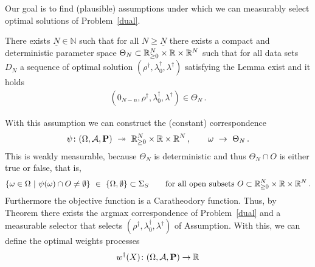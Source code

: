 Our goal is to find (plausible) assumptions under which we can measurably select optimal solutions of Problem~\ref{dual}.

\begin{assumption}
  There exists $\underline{N}\in\mathbb{N}$ such that 
  for all $N\ge \underline{N}$ 
  there exists a compact and deterministic parameter space
  $
  \Theta_N
  \subset
  \mathbb{R}^N_{\ge 0}
  \times
  \mathbb{R}
  \times
  \mathbb{R}^{N}
  $
  such that for all data sets $D_N$
  a sequence of optimal solution
  $(\rho^\dagger,\lambda_0^\dagger,\lambda^\dagger)$
  satisfying the Lemma
exist and it holds
\begin{gather*}
  (0_{N-n},
  \rho^\dagger,\lambda_0^\dagger,\lambda^\dagger)
  \in
  \Theta_N
  \,.
\end{gather*}
\end{assumption}

With this assumption we can construct the (constant) correspondence
\begin{align*}
  \psi
  \colon
  (\Omega,\mathcal{A},\P)
  \ 
  \twoheadrightarrow
  \ 
  \R^N_{\ge 0}
  \times
  \R
  \times
  \R^{N}
  \,,
  \qquad
  \omega
  \ 
  \to
  \ 
  \Theta_N
  \,.
\end{align*}
This is weakly measurable, because $\Theta_N$ is deterministic and thus
$\Theta_N\cap O$ is either true or false, that is,
  \begin{gather*}
    \left\{ 
      \omega\in \Omega
      \ 
      |
      \ 
      \psi(\omega)
      \cap
      O
      \neq
      \emptyset
    \right\}
    \ 
    \in
    \ 
    \left\{ \Omega,\emptyset \right\}
    \subset
    \Sigma_S
    \qquad
    \text{for all open subsets}
    \ 
    O
    \subset
  \R^N_{\ge 0}
  \times
  \R
  \times
  \R^{N}
    \,.
  \end{gather*}
  Furthermore the objective function is a Caratheodory function.
  Thus, by Theorem there exists the argmax correspondence  of Problem~\ref{dual} and a measurable selector that selects
  $(\rho^\dagger,\lambda_0^\dagger,\lambda^\dagger)$ of Assumption.
  With this, we can define the optimal weights processes
  \begin{gather*}
    w^\dagger(X)
    \colon
    (\Omega,\mathcal{A},\mathbf{P})
    \to
    \mathbb{R}
    \\
  \end{gather*}
